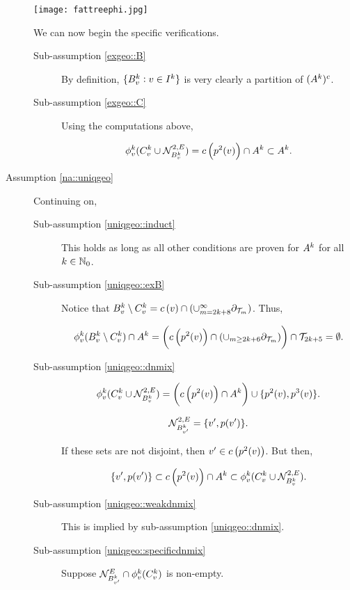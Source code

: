 \begin{description}
\texttt{[image: fattreephi.jpg]}

We can now begin the specific verifications.

\begin{description}
\item[Sub-assumption \ref{exgeo::B}] By definition, \(\{B^{k}_v:v \in I^{k}\}\) is very clearly a partition of \((A^{k})^c\).

\item[Sub-assumption \ref{exgeo::C}] Using the computations above,

\[\phi^{k}_v(C^{k}_v\cup\mathcal{N}^{2,E}_{B^{k}_v}) = c\left(p^2(v)\right)\cap A^{k} \subset A^{k}.\]
\end{description}

\item[Assumption \ref{na::uniqgeo}] Continuing on,

\begin{description}
\item[Sub-assumption \ref{uniqgeo::induct}] This holds as long as all other conditions are proven for \(A^{k}\) for all \(k \in \mathbb{N}_0\).

\item[Sub-assumption \ref{uniqgeo::exB}] Notice that \(B^{k}_v\setminus C^{k}_v = c\left(v\right)\cap(\cup_{m=2k+8}^\infty \partial_{\mathcal{T}_{m}})\). Thus,

\[\phi^{k}_v(B^{k}_v\setminus C^{k}_v)\cap A^{k} = \left(c\left(p^2(v)\right)\cap(\cup_{m \geq 2k+6} \partial_{\mathcal{T}_{m}})\right)\cap \mathcal{T}_{2k+5} = \emptyset.\]

\item[Sub-assumption \ref{uniqgeo::dnmix}] 

\[\phi^{k}_v(C^{k}_v\cup \mathcal{N}^{2,E}_{B^{k}_v}) = \left(c\left(p^2(v)\right)\cap A^{k}\right)\cup \{p^2(v),p^3(v)\}.\]

\[ \mathcal{N}^{2,E}_{B^{k}_{v'}} = \{v',p(v')\}.\]

If these sets are not disjoint, then \(v' \in c\left(p^2(v)\right)\). But then,

\[\{v',p(v')\} \subset c\left(p^2(v)\right)\cap A^{k} \subset \phi^{k}_v(C^{k}_v\cup \mathcal{N}^{2,E}_{B^{k}_v}).\]

\item[Sub-assumption \ref{uniqgeo::weakdnmix}] This is implied by sub-assumption \ref{uniqgeo::dnmix}.

\item[Sub-assumption \ref{uniqgeo::specificdnmix}] Suppose \(\mathcal{N}^E_{B^{k}_{v'}}\cap \phi^{k}_v(C^{k}_v)\) is non-empty. 


\end{description}
\end{description}
